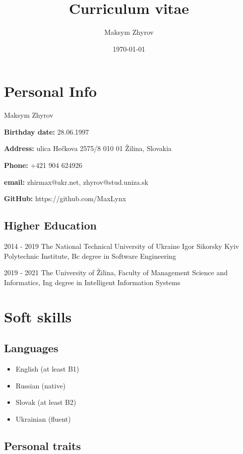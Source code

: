 \documentclass[a4paper,12pt]{article}
\author{Maksym Zhyrov}
\title{Curriculum vitae}
\date{\today}
\begin{document}
\section*{Personal Info}


{\Large Maksym Zhyrov}

\bigskip

\textbf{Birthday date:} 28.06.1997

\smallskip

\textbf{Address:} 
ulica Hečkova 2575/8
010 01 Žilina, 
Slovakia

\smallskip

\textbf{Phone:} +421 904 624926

\smallskip

\textbf{email:} 
zhirmax@ukr.net, 
zhyrov@stud.uniza.sk 

\smallskip

\textbf{GitHub:} https://github.com/MaxLynx

\subsection*{Higher Education}

2014 - 2019 The National Technical University of Ukraine 
Igor Sikorsky Kyiv Polytechnic Institute,
Bc degree in Software Engineering

2019 - 2021 The University of Žilina,
Faculty of Management Science and Informatics,
Ing degree in Intelligent Information Systems

\section*{Soft skills}

\subsection*{Languages}

\begin{multicols}{2}
\begin{itemize}
    \item English (at least B1)
    \item Russian (native)
    \item Slovak (at least B2)
    \item Ukrainian (fluent)
\end{itemize}
\end{multicols}

\subsection*{Personal traits}
\end{document}
